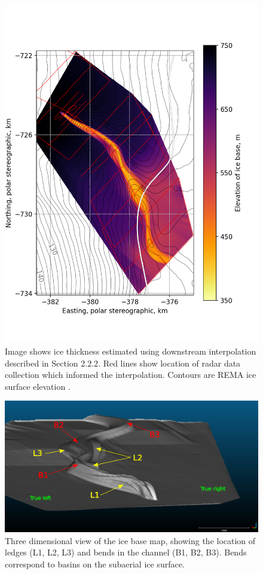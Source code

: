 \begin{figure}[!ht]
\centering
\includegraphics[width=1.1\textwidth]{chapters/2/thickness_solo.png}
\caption[Ice thickness]{Image shows ice thickness estimated using downstream interpolation described in Section 2.2.2. Red lines show location of radar data collection which informed the interpolation. Contours are REMA ice surface elevation \cite{howat2019reference}.}
\label{fig:thickness_solo}
\end{figure}



\begin{figure}[!ht]
\centering
\includegraphics[width=1.1\textwidth]{chapters/2/ledges1.png}
\caption[3D ledge view (A)]{Three dimensional view of the ice base map, showing the location of ledges (L1, L2, L3) and bends in the channel (B1, B2, B3). Bends correspond to basins on the subaerial ice surface.}
\label{fig:ledges1}
\end{figure}

